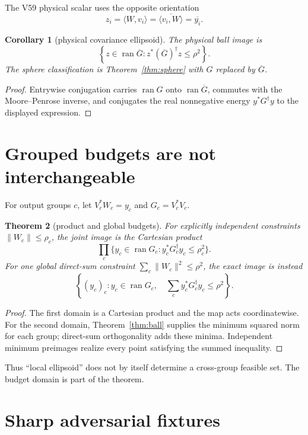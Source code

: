 \documentclass[11pt]{article}
\newtheorem{theorem}{Theorem}[section]
\newtheorem{corollary}[theorem]{Corollary}
\theoremstyle{remark}
\newcommand{\Ran}{\operatorname{ran}}
\begin{document}
The V59 physical scalar uses the opposite orientation
\[
 z_i=\langle W,v_i\rangle=\overline{\langle v_i,W\rangle}
 =\overline{y_i}.
\]

\begin{corollary}[physical covariance ellipsoid]\label{cor:physical}
The physical ball image is
\[
 \left\{z\in\Ran\overline G:
 z^*(\overline G)^\dagger z\leq\rho^2\right\}.
\]
The sphere classification is Theorem~\ref{thm:sphere} with $G$ replaced by
$\overline G$.
\end{corollary}

\begin{proof}
Entrywise conjugation carries $\Ran G$ onto $\Ran\overline G$, commutes with
the Moore--Penrose inverse, and conjugates the real nonnegative energy
$y^*G^\dagger y$ to the displayed expression.
\end{proof}

\section{Grouped budgets are not interchangeable}

For output groups $c$, let $V_c^*W_c=y_c$ and $G_c=V_c^*V_c$.

\begin{theorem}[product and global budgets]\label{thm:groups}
For explicitly independent constraints $\|W_c\|\leq\rho_c$, the joint image is
the Cartesian product
\[
 \prod_c\{y_c\in\Ran G_c:y_c^*G_c^\dagger y_c\leq\rho_c^2\}.
\]
For one global direct-sum constraint
$\sum_c\|W_c\|^2\leq\rho^2$, the exact image is instead
\[
 \left\{(y_c)_c: y_c\in\Ran G_c,\quad
 \sum_c y_c^*G_c^\dagger y_c\leq\rho^2\right\}.
\]
\end{theorem}

\begin{proof}
The first domain is a Cartesian product and the map acts coordinatewise.  For
the second domain, Theorem~\ref{thm:ball} supplies the minimum squared norm for
each group; direct-sum orthogonality adds these minima.  Independent minimum
preimages realize every point satisfying the summed inequality.
\end{proof}

Thus ``local ellipsoid'' does not by itself determine a cross-group feasible
set.  The budget domain is part of the theorem.

\section{Sharp adversarial fixtures}
\end{document}
